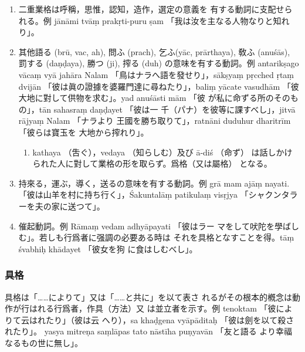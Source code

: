 \numberParagraph
\begin{enumerate}[label=(\arabic*)]
\item 二重業格は呼稱，思惟，認知，造作，選定の意義を
有する動詞に支配せられる。例 jānāmi tvāṃ prakṛti-puru\-%
ṣam 「我は汝を主なる人物なりと知れり」。
\item 其他語る (brū, vac, ah), 問ふ (prach), 乞ふ(yāc,
prārthaya), 敎ふ (anuśās), 罰する (daṇḍaya), 勝つ (ji),
搾る (duh) の意味を有する動詞。例 antarikṣago vācaṃ vyā\-%
jahāra Nalam 「鳥はナラへ語を發せり」，sākṣyaṃ pṛcched
ṛtaṃ dvijān 「彼は眞の證據を婆羅門達に尋ねたり」，baliṃ yācate
vasudhām 「彼大地に對して供物を求む」。yad anuśāsti mām 「彼
が私に命ずる所のそのもの」，tān sahasraṃ daṇḍayet 「彼は一
千（パナ）を彼等に課すべし」，jitvā rājyaṃ Nalam 「ナラより
王國を勝ち取りて」，ratnāni duduhur dharitrīm 「彼らは寶玉を
大地から搾れり」。
\begin{enumerate}[label=(\alph*)]
\item kathaya （吿ぐ），vedaya （知らしむ）及び ā-diś （命ず）
は話しかけられた人に對して業格の形を取らず。爲格（又は屬格）
となる。
\end{enumerate}
\item 持來る，運ぶ，導く，送るの意味を有する動詞。例 grā\-%
mam ajāṃ nayati. 「彼は山羊を村に持ち行く」，Śakuntalāṃ
patikulaṃ visṛjya 「シャクンタラーを夫の家に送つて」。
\item 催起動詞。例 Rāmaṃ vedam adhyāpayati 「彼はラー
マをして吠陀を學ばしむ」。若しも行爲者に强調の必要ある時は
それを具格となすことを得。tāṃ śvabhiḥ khādayet 「彼女を狗
に食はしむべし」。
\end{enumerate}

\subsubsection{具格}
\numberParagraph
具格は「……によりて」又は「……と共に」を以て表さ
れるがその根本的槪念は動作が行はれる行爲者，作具（方法）又
は並立者を示す。例 tenoktam 「彼によりて云はれたり」（彼は云
へり），sa khaḍgena vyāpāditaḥ 「彼は劍を以て殺されたり」。
yasya mitreṇa saṃlāpas tato nāstīha puṇyavān 「友と語る
より幸福なるもの世に無し」。


